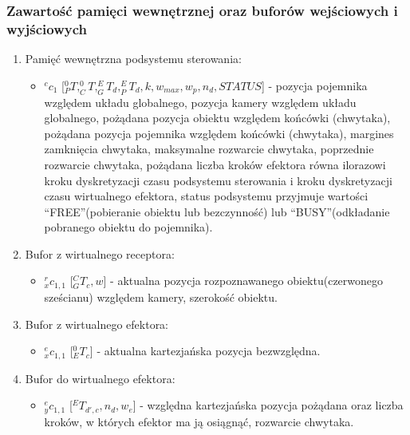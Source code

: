 \documentclass{article}
\begin{document}
\subsubsection{Zawarto\'sć pamięci wewnętrznej oraz buforów wej\'sciowych i wyj\'sciowych}
\begin{enumerate}
\item Pamięć wewnętrzna podsystemu sterowania:
\begin{itemize}
\item $^cc_{1}$ [$^0_PT,^0_CT, ^E_GT_d, ^E_PT_d, k, w_{max},w_p, n_d, STATUS$] - pozycja pojemnika względem układu globalnego, pozycja kamery względem układu globalnego, pożądana pozycja obiektu względem końcówki (chwytaka), pożądana pozycja pojemnika względem końcówki (chwytaka), margines zamknięcia chwytaka, maksymalne rozwarcie chwytaka, poprzednie rozwarcie chwytaka, pożądana liczba kroków efektora równa ilorazowi kroku dyskretyzacji czasu podsystemu sterowania i kroku dyskretyzacji czasu wirtualnego efektora, status podsystemu przyjmuje warto\'sci ``FREE''(pobieranie obiektu lub bezczynno\'sć) lub ``BUSY''(odkładanie pobranego obiektu do pojemnika).
\end{itemize}
\item Bufor z wirtualnego receptora:
\begin{itemize}
\item $^r_xc_{1,1}$ [$^C_GT_c, w$] - aktualna pozycja rozpoznawanego obiektu(czerwonego sze\'scianu) względem kamery, szeroko\'sć obiektu.
\end{itemize}
\item Bufor z wirtualnego efektora:
\begin{itemize}
\item $^e_xc_{1,1}$ [$^0_ET_c$] - aktualna kartezjańska pozycja bezwzględna.
\end{itemize}
\item Bufor do wirtualnego efektora:
\begin{itemize}
\item $^e_yc_{1,1}$ [$^ET_{d',c}, n_d, w_e$] - względna kartezjańska pozycja pożądana oraz liczba kroków, w których efektor ma ją osiągnąć, rozwarcie chwytaka.
\end{itemize}
\end{enumerate}

\end{document}
